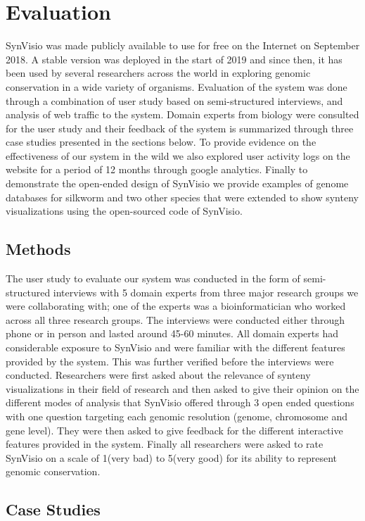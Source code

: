 \chapter{Evaluation}

SynVisio was made publicly available to use for free on the Internet on September 2018. A stable version was deployed in the start of 2019 and since then, it has been used by several researchers across the world in exploring genomic conservation in a wide variety of organisms. Evaluation of the system was done through a combination of user study based on semi-structured interviews, and analysis of web traffic to the system. Domain experts from biology were consulted for the user study and their feedback of the system is summarized through three case studies presented in the sections below. To provide evidence on the effectiveness of our system in the wild we also explored user activity logs on the website for a period of 12 months through google analytics. Finally to demonstrate the open-ended design of SynVisio we provide examples of genome databases for silkworm and two other species that were extended to show synteny visualizations using the open-sourced code of SynVisio.

\section{Methods}
The user study to evaluate our system was conducted in the form of semi-structured interviews with 5 domain experts from three major research groups we were collaborating with; one of the experts was a bioinformatician who worked across all three research groups. The interviews were conducted either through phone or in person and lasted around 45-60 minutes. All domain experts had considerable exposure to SynVisio and were familiar with the different features provided by the system. This was further verified before the interviews were conducted. Researchers were first asked about the relevance of synteny visualizations in their field of research and then asked to give their opinion on the different modes of analysis that SynVisio offered through 3 open ended questions with one question targeting each genomic resolution (genome, chromosome and gene level). They were then asked to give feedback for the different interactive features provided in the system. Finally all researchers were asked to rate SynVisio on a scale of 1(very bad) to 5(very good) for its ability to represent genomic conservation.


\section{Case Studies}

